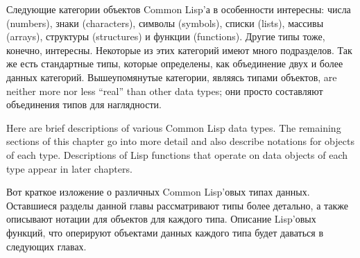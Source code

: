 Следующие категории объектов Common Lisp'а в особенности
интересны: числа (numbers), знаки (characters), символы (symbols),
списки (lists), массивы (arrays), структуры (structures) и функции
(functions). Другие типы тоже, конечно, интересны. Некоторые из
этих категорий имеют много подразделов. Так же есть стандартные
типы, которые определены, как объединение двух и более данных
категорий. Вышеупомянутые категории, являясь типами объектов, are
neither more nor less ``real'' than other data types; они просто
составляют объединения типов для наглядности. 

Here are brief descriptions of various Common Lisp data types.
The remaining sections of this chapter go into more detail
and also describe notations for objects
of each type.  Descriptions of Lisp functions that operate
on data objects of each type appear in later chapters.

Вот краткое изложение о различных Common Lisp'овых типах
данных. Оставшиеся разделы данной главы рассматривают типы более
детально, а также описывают нотации для объектов для каждого
типа. Описание Lisp'овых функций, что оперируют объектами данных
каждого типа будет даваться в следующих главах. 

